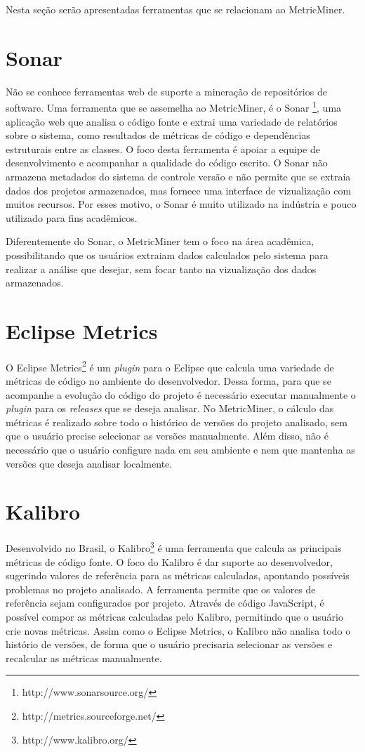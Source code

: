 \documentclass[a4paper, 12pt, twoside]{book}
\begin{document}
Nesta seção serão apresentadas ferramentas que se relacionam ao MetricMiner.
\section{Sonar}
    Não se conhece ferramentas web de suporte a mineração de repositórios de software. Uma ferramenta que se assemelha ao MetricMiner, é o Sonar \footnote{http://www.sonarsource.org/}, uma aplicação web que analisa o código fonte e extrai uma variedade de relatórios sobre o sistema, como resultados de métricas de código e dependências estruturais entre as classes. O foco desta ferramenta é apoiar a equipe de desenvolvimento e acompanhar a qualidade do código escrito. O Sonar não armazena metadados do sistema de controle versão e não permite que se extraia dados dos projetos armazenados, mas fornece uma interface de vizualização com muitos recursos. Por esses motivo, o Sonar é muito utilizado na indústria e pouco utilizado para fins acadêmicos.
    
    Diferentemente do Sonar, o MetricMiner tem o foco na área acadêmica, possibilitando que os usuários extraiam dados calculados pelo sistema para realizar a análise que desejar, sem focar tanto na vizualização dos dados armazenados.

\section{Eclipse Metrics}
    O Eclipse Metrics\footnote{http://metrics.sourceforge.net/} é um \textit{plugin} para o Eclipse que calcula uma variedade de métricas de código no ambiente do desenvolvedor. Dessa forma, para que se acompanhe a evolução do código do projeto é necessário executar manualmente o \textit{plugin} para os \textit{releases} que se deseja analisar. No MetricMiner, o cálculo das métricas é realizado sobre todo o histórico de versões do projeto analisado, sem que o usuário precise selecionar as versões manualmente. Além disso, não é necessário que o usuário configure nada em seu ambiente e nem que mantenha as versões que deseja analisar localmente.
    
\section{Kalibro}
    Desenvolvido no Brasil, o Kalibro\footnote{http://www.kalibro.org/} é uma ferramenta que calcula as principais métricas de código fonte. O foco do Kalibro é dar suporte ao desenvolvedor, sugerindo valores de referência para as métricas calculadas, apontando possíveis problemas no projeto analisado. A ferramenta permite que os valores de referência sejam configurados por projeto. Através de código JavaScript, é possível compor as métricas calculadas pelo Kalibro, permitindo que o usuário crie novas métricas. Assim como o Eclipse Metrics, o Kalibro não analisa todo o histório de versões, de forma que o usuário precisaria selecionar as versões e recalcular as métricas manualmente.
\end{document}
